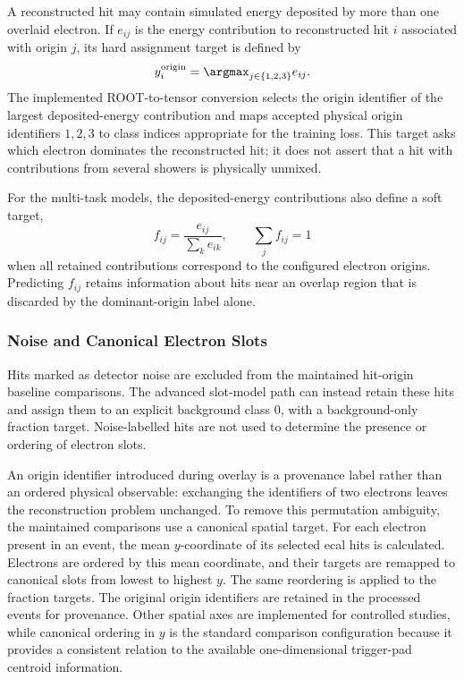 A reconstructed hit may contain simulated energy deposited by more than one
overlaid electron. If \(e_{ij}\) is the energy contribution to reconstructed
hit \(i\) associated with origin \(j\), its hard assignment target is defined
by
\begin{equation}
    y_i^{\mathrm{origin}} =
    \argmax_{j \in \{1,2,3\}} e_{ij}.
    \label{eq:dominant_origin_target}
\end{equation}
The implemented ROOT-to-tensor conversion selects the origin identifier of
the largest deposited-energy contribution and maps accepted physical origin
identifiers \(1,2,3\) to class indices appropriate for the training loss.
This target asks which electron dominates the reconstructed hit; it does not
assert that a hit with contributions from several showers is physically
unmixed.

For the multi-task models, the deposited-energy contributions also define a
soft target,
\begin{equation}
    f_{ij} =
    \frac{e_{ij}}{\sum_k e_{ik}},
    \qquad
    \sum_j f_{ij}=1
\end{equation}
when all retained contributions correspond to the configured electron
origins. Predicting \(f_{ij}\) retains information about hits near an overlap
region that is discarded by the dominant-origin label alone.

\subsubsection{Noise and Canonical Electron Slots}

Hits marked as detector noise are excluded from the maintained hit-origin
baseline comparisons. The advanced slot-model path can instead retain these
hits and assign them to an explicit background class \(0\), with a
background-only fraction target. Noise-labelled hits are not used to
determine the presence or ordering of electron slots.

An origin identifier introduced during overlay is a provenance label rather
than an ordered physical observable: exchanging the identifiers of two
electrons leaves the reconstruction problem unchanged. To remove this
permutation ambiguity, the maintained comparisons use a canonical spatial
target. For each electron present in an event, the mean \(y\)-coordinate of
its selected \gls{ecal} hits is calculated. Electrons are ordered by this
mean coordinate, and their targets are remapped to canonical slots from
lowest to highest \(y\). The same reordering is applied to the fraction
targets. The original origin identifiers are retained in the processed
events for provenance. Other spatial axes are implemented for controlled
studies, while canonical ordering in \(y\) is the standard comparison
configuration because it provides a consistent relation to the available
one-dimensional trigger-pad centroid information.

